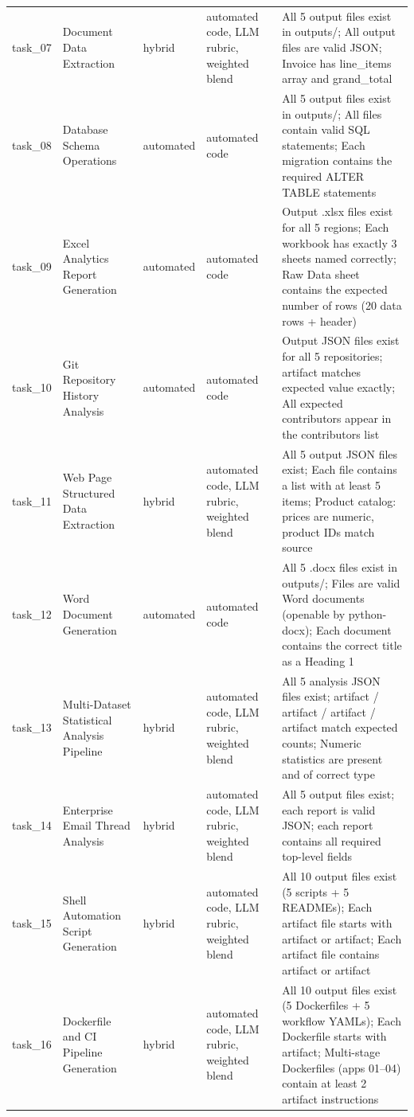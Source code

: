 \documentclass[11pt]{article}
\begin{document}
\begin{longtable}{L{0.07\textwidth}L{0.21\textwidth}L{0.11\textwidth}L{0.16\textwidth}L{0.38\textwidth}}
task\_07 & Document Data Extraction & hybrid & automated code, LLM rubric, weighted blend & All 5 output files exist in outputs/; All output files are valid JSON; Invoice has line\_items array and grand\_total \\
task\_08 & Database Schema Operations & automated & automated code & All 5 output files exist in outputs/; All files contain valid SQL statements; Each migration contains the required ALTER TABLE statements \\
task\_09 & Excel Analytics Report Generation & automated & automated code & Output .xlsx files exist for all 5 regions; Each workbook has exactly 3 sheets named correctly; Raw Data sheet contains the expected number of rows (20 data rows + header) \\
task\_10 & Git Repository History Analysis & automated & automated code & Output JSON files exist for all 5 repositories; artifact matches expected value exactly; All expected contributors appear in the contributors list \\
task\_11 & Web Page Structured Data Extraction & hybrid & automated code, LLM rubric, weighted blend & All 5 output JSON files exist; Each file contains a list with at least 5 items; Product catalog: prices are numeric, product IDs match source \\
task\_12 & Word Document Generation & automated & automated code & All 5 .docx files exist in outputs/; Files are valid Word documents (openable by python-docx); Each document contains the correct title as a Heading 1 \\
task\_13 & Multi-Dataset Statistical Analysis Pipeline & hybrid & automated code, LLM rubric, weighted blend & All 5 analysis JSON files exist; artifact / artifact / artifact / artifact match expected counts; Numeric statistics are present and of correct type \\
task\_14 & Enterprise Email Thread Analysis & hybrid & automated code, LLM rubric, weighted blend & All 5 output files exist; each report is valid JSON; each report contains all required top-level fields \\
task\_15 & Shell Automation Script Generation & hybrid & automated code, LLM rubric, weighted blend & All 10 output files exist (5 scripts + 5 READMEs); Each artifact file starts with artifact or artifact; Each artifact file contains artifact or artifact \\
task\_16 & Dockerfile and CI Pipeline Generation & hybrid & automated code, LLM rubric, weighted blend & All 10 output files exist (5 Dockerfiles + 5 workflow YAMLs); Each Dockerfile starts with artifact; Multi-stage Dockerfiles (apps 01--04) contain at least 2 artifact instructions \\

\end{longtable}
\end{document}
